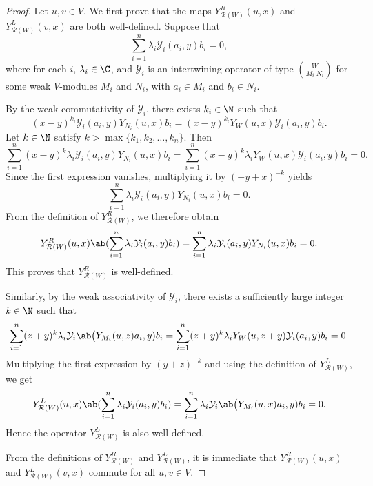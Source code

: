 \documentclass[12pt, english]{article}
\numberwithin{equation}{section}
\theoremstyle{plain}
\theoremstyle{definition}
\theoremstyle{remark}
\begin{document}
	\begin{proof}
		
		Let $u, v \in V$. We first prove that the maps $Y_{\mathcal{R}(W)}^R(u, x)$ and $Y_{\mathcal{R}(W)}^L(v, x)$ are both well-defined.
		Suppose that
		\[
		\sum_{i = 1}^n \lambda_i \mathcal{Y}_i(a_i, y) b_i = 0,
		\]
		where for each $i$, $\lambda_i \in \C$, and $\mathcal{Y}_i$ is an intertwining operator of type $\binom{W}{M_i \; N_i}$ for some weak $V$-modules $M_i$ and $N_i$, with $a_i \in M_i$ and $b_i \in N_i$.
		
		By the weak commutativity of $\mathcal{Y}_i$, there exists $k_i \in \N$ such that
		\[
		(x-y)^{k_i} \mathcal{Y}_i(a_i, y) Y_{N_i}(u, x) b_i
		= (x-y)^{k_i} Y_{W}(u, x) \mathcal{Y}_i(a_i, y) b_i.
		\]
		Let $k \in \N$ satisfy $k > \max \{k_1, k_2, \dots, k_n\}$. Then
		\[
		\sum_{i = 1}^n (x-y)^k \lambda_i \mathcal{Y}_i(a_i, y) Y_{N_i}(u, x) b_i
		= \sum_{i = 1}^n (x-y)^k \lambda_i Y_{W}(u, x) \mathcal{Y}_i(a_i, y) b_i
		= 0.
		\]
		Since the first expression vanishes, multiplying it by $(-y+x)^{-k}$ yields
		\[
		\sum_{i = 1}^n \lambda_i \mathcal{Y}_i(a_i, y) Y_{N_i}(u, x) b_i = 0.
		\]
		From the definition of $Y_{\mathcal{R}(W)}^R$, we therefore obtain
		\[
		Y^R_{\mathcal{R}(W)}(u, x) \ab(\sum_{i = 1}^n \lambda_i \mathcal{Y}_i(a_i, y) b_i)
		= \sum_{i = 1}^n \lambda_i \mathcal{Y}_i(a_i, y) Y_{N_i}(u, x) b_i = 0.
		\]
		This proves that $Y_{\mathcal{R}(W)}^R$ is well-defined.
		
		Similarly, by the weak associativity of $\mathcal{Y}_i$, there exists a sufficiently large integer $k \in \N$ such that
		\[
		\sum_{i = 1}^n (z+y)^k \lambda_i \mathcal{Y}_i \ab\big(Y_{M_i}(u, z) a_i, y) b_i
		= \sum_{i = 1}^n (z+y)^k \lambda_i Y_{W}(u, z+y) \mathcal{Y}_i(a_i, y) b_i
		= 0.
		\]
		Multiplying the first expression by $(y+z)^{-k}$ and using the definition of $Y_{\mathcal{R}(W)}^L$, we get
		\[
		Y^L_{\mathcal{R}(W)}(u, x) \ab(\sum_{i = 1}^n \lambda_i \mathcal{Y}_i(a_i, y) b_i)
		= \sum_{i = 1}^n \lambda_i \mathcal{Y}_i \ab\big(Y_{M_i}(u, x) a_i, y) b_i
		= 0.
		\]
		Hence the operator $Y_{\mathcal{R}(W)}^L$ is also well-defined.
		
		From the definitions of $Y_{\mathcal{R}(W)}^R$ and $Y_{\mathcal{R}(W)}^L$,
		it is immediate that $Y_{\mathcal{R}(W)}^R(u, x)$ and $Y_{\mathcal{R}(W)}^L(v, x)$ commute for all $u, v \in V$.
		

\end{proof}
\end{document}

